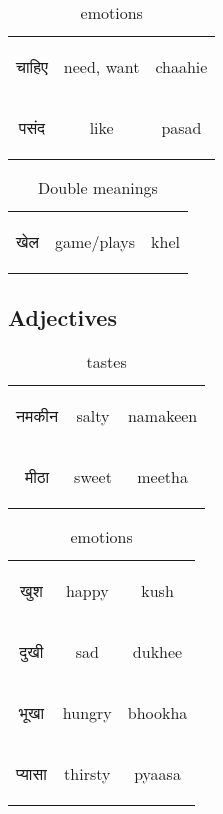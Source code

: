 \begin{table}[H]
    \centering
    \begin{tabular}{c|c|c}
        \begin{hindi}चाहिए \end{hindi} & need, want & chaahie\\
        \begin{hindi}पसंद  \end{hindi} & like & pasad\\
    \end{tabular}
    \caption{emotions}
    \label{tab:verb_emotions}
\end{table}

\begin{table}[H]
    \centering
    \begin{tabular}{c|c|c}
        \begin{hindi} खेल \end{hindi} & game/plays & khel \\
    \end{tabular}
    \caption{Double meanings}
    \label{tab:doublemeanings}
\end{table}

\newpage  
\subsection{Adjectives}

\begin{table}[H]
    \centering
    \begin{tabular}{c|c|c}        
    \begin{hindi}नमकीन\end{hindi} & salty & namakeen \\
    \begin{hindi}मीठा\end{hindi} & sweet & meetha \\

    \end{tabular}
    \caption{tastes}
    \label{tab:adjectives_tastes}
\end{table}


\begin{table}[H]
    \centering
    \begin{tabular}{c|c|c}        
    \begin{hindi} खुश \end{hindi} & happy & kush \\
    \begin{hindi} दुखी \end{hindi} & sad & dukhee \\
    \begin{hindi} भूखा \end{hindi} & hungry & bhookha \\
    \begin{hindi} प्यासा \end{hindi} & thirsty & pyaasa \\
    \end{tabular}
    \caption{emotions}
    \label{tab:adjectives_emotions}
\end{table}

